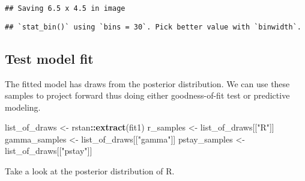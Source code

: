 \documentclass[11pt,]{article}
\newenvironment{Shaded}{\begin{snugshade}}{\end{snugshade}}
\newcommand{\KeywordTok}[1]{\textcolor[rgb]{0.13,0.29,0.53}{\textbf{#1}}}
\newcommand{\DataTypeTok}[1]{\textcolor[rgb]{0.13,0.29,0.53}{#1}}
\newcommand{\StringTok}[1]{\textcolor[rgb]{0.31,0.60,0.02}{#1}}
\newcommand{\OperatorTok}[1]{\textcolor[rgb]{0.81,0.36,0.00}{\textbf{#1}}}
\newcommand{\NormalTok}[1]{#1}
\begin{document}
\begin{verbatim}
## Saving 6.5 x 4.5 in image
\end{verbatim}

\begin{verbatim}
## `stat_bin()` using `bins = 30`. Pick better value with `binwidth`.
\end{verbatim}

\subsection{Test model fit}\label{test-model-fit}

The fitted model has draws from the posterior distribution. We can use
these samples to project forward thus doing either goodness-of-fit test
or predictive modeling.

\begin{Shaded}
\begin{Highlighting}[]
\NormalTok{list_of_draws <-}\StringTok{ }\NormalTok{rstan}\OperatorTok{::}\KeywordTok{extract}\NormalTok{(fit1)}
\NormalTok{r_samples     <-}\StringTok{ }\NormalTok{list_of_draws[[}\StringTok{"R"}\NormalTok{]]}
\NormalTok{gamma_samples <-}\StringTok{ }\NormalTok{list_of_draws[[}\StringTok{"gamma"}\NormalTok{]]}
\NormalTok{pstay_samples <-}\StringTok{ }\NormalTok{list_of_draws[[}\StringTok{"pstay"}\NormalTok{]]}
\end{Highlighting}
\end{Shaded}

Take a look at the posterior distribution of R.

\begin{Shaded}
\end{Shaded}
\end{document}
